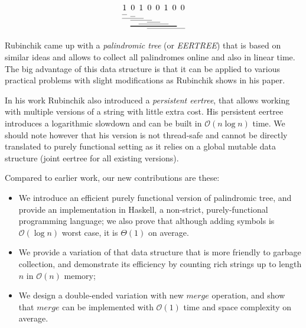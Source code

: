 \[
  \begin{tabular}[t]{ @{} *{10}{ w{c}{1em} @{} } }
    1&0&1&0&0&1&0&0 \\
    \cmidrule(l{2pt}r{2pt}){1-1} \morecmidrules
    \cmidrule(l{2pt}r{2pt}){2-2} \morecmidrules
    \cmidrule(l{2pt}r{2pt}){1-3} \morecmidrules
    \cmidrule(l{2pt}r{2pt}){2-4} \morecmidrules
    \cmidrule(l{2pt}r{2pt}){4-5} \morecmidrules
    \cmidrule(l{2pt}r{2pt}){3-6} \morecmidrules
    \cmidrule[0.1em](l{2pt}r{2pt}){2-7} \morecmidrules
    \cmidrule(l{2pt}r{2pt}){4-8}
  \end{tabular}
\]

Rubinchik \cite{RUBINCHIK2018249} came up with a
\emph{palindromic tree} (or \emph{EERTREE}) that is based
on similar ideas and allows to collect all palindromes
online and also in linear time. The big advantage of
this data structure is that it can be applied to various
practical problems with slight modifications as Rubinchik
shows in his paper.

In his work Rubinchik also introduced a \emph{persistent eertree},
that allows working with multiple versions of a string
with little extra cost. His persistent eertree introduces
a logarithmic slowdown and can be built in $\mathcal{O}(n \log{} n)$ time.
We should note however that his version is not thread-safe
and cannot be directly translated to purely functional setting
as it relies on a global mutable data structure
(joint eertree for all existing versions).



Compared to earlier work, our new contributions are these:

\begin{itemize}
\item We introduce an efficient purely functional version of palindromic tree,
  and provide an implementation in Haskell, a non-strict, purely-functional
  programming language; we also prove that although adding symbols is
  $\mathcal{O}(\log{}n)$ worst case, it is $\Theta(1)$ on average.
\item We provide a variation of that data structure that is more
  friendly to garbage collection, and demonstrate its efficiency
  by counting rich strings up to length $n$ in $\mathcal{O}(n)$ memory;
\item We design a double-ended variation with new $merge$ operation,
  and show that $merge$ can be implemented with $\mathcal{O}(1)$
  time and space complexity on average.
\end{itemize}

